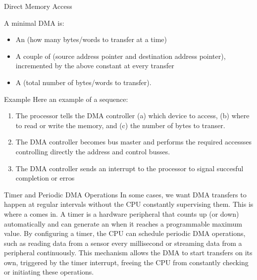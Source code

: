 \begin{parag}{Direct Memory Access}
   \begin{definition}
   A minimal DMA is:
   \begin{itemize}
       \item An  (how many bytes/words to transfer at a time)
       \item A couple of  (source address pointer and destination address pointer), incremented by the above constant at every transfer 
       \item A  (total number of bytes/words to transfer).
   \end{itemize}
   \end{definition} 
   \begin{subparag}{Example}
       Here an example of a sequence:
	   \begin{enumerate}
	       \item The processor tells the DMA controller (a) which device to access, (b) where to read or write the memory, and (c) the number of bytes to transer.
	       \item The DMA controller becomes bus master and performs the required accessses controlling directly the address and control busses.
	       \item The DMA controller sends an interrupt to the processor to signal succesful completion or erros
	   \end{enumerate}
	   
   \end{subparag}
\end{parag}



\begin{parag}{Timer and Periodic DMA Operations}
    In some cases, we want DMA transfers to happen at regular intervals without the CPU constantly supervising them. This is where a  comes in. A timer is a hardware peripheral that counts up (or down) automatically and can generate an  when it reaches a programmable maximum value. By configuring a timer, the CPU can schedule periodic DMA operations, such as reading data from a sensor every millisecond or streaming data from a peripheral continuously. This mechanism allows the DMA to start transfers on its own, triggered by the timer interrupt, freeing the CPU from constantly checking or initiating these operations.
\end{parag}

